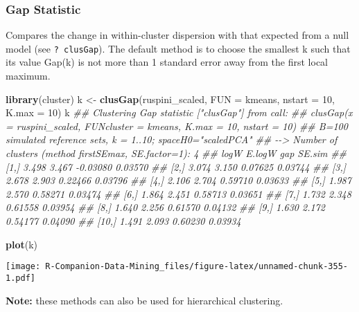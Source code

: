 \documentclass[
  notitlepage]{book}
\newenvironment{Shaded}{\begin{snugshade}}{\end{snugshade}}
\newcommand{\CommentTok}[1]{\textcolor[rgb]{0.56,0.35,0.01}{\textit{#1}}}
\newcommand{\DataTypeTok}[1]{\textcolor[rgb]{0.13,0.29,0.53}{#1}}
\newcommand{\DecValTok}[1]{\textcolor[rgb]{0.00,0.00,0.81}{#1}}
\newcommand{\KeywordTok}[1]{\textcolor[rgb]{0.13,0.29,0.53}{\textbf{#1}}}
\newcommand{\NormalTok}[1]{#1}
\newcommand{\StringTok}[1]{\textcolor[rgb]{0.31,0.60,0.02}{#1}}
\begin{document}
\hypertarget{gap-statistic}{%
\subsubsection{Gap Statistic}\label{gap-statistic}}

Compares the change in within-cluster dispersion with that expected from
a null model (see \texttt{?\ clusGap}). The default method is to choose the
smallest k such that its value Gap(k) is not more than 1 standard error
away from the first local maximum.

\begin{Shaded}
\begin{Highlighting}[]
\KeywordTok{library}\NormalTok{(cluster)}
\NormalTok{k \textless{}{-}}\StringTok{ }\KeywordTok{clusGap}\NormalTok{(ruspini\_scaled, }
             \DataTypeTok{FUN =}\NormalTok{ kmeans,  }
             \DataTypeTok{nstart =} \DecValTok{10}\NormalTok{, }
             \DataTypeTok{K.max =} \DecValTok{10}\NormalTok{)}
\NormalTok{k}
\CommentTok{\#\# Clustering Gap statistic ["clusGap"] from call:}
\CommentTok{\#\# clusGap(x = ruspini\_scaled, FUNcluster = kmeans, K.max = 10, nstart = 10)}
\CommentTok{\#\# B=100 simulated reference sets, k = 1..10; spaceH0="scaledPCA"}
\CommentTok{\#\#  {-}{-}\textgreater{} Number of clusters (method \textquotesingle{}firstSEmax\textquotesingle{}, SE.factor=1): 4}
\CommentTok{\#\#        logW E.logW      gap  SE.sim}
\CommentTok{\#\#  [1,] 3.498  3.467 {-}0.03080 0.03570}
\CommentTok{\#\#  [2,] 3.074  3.150  0.07625 0.03744}
\CommentTok{\#\#  [3,] 2.678  2.903  0.22466 0.03796}
\CommentTok{\#\#  [4,] 2.106  2.704  0.59710 0.03633}
\CommentTok{\#\#  [5,] 1.987  2.570  0.58271 0.03474}
\CommentTok{\#\#  [6,] 1.864  2.451  0.58713 0.03651}
\CommentTok{\#\#  [7,] 1.732  2.348  0.61558 0.03954}
\CommentTok{\#\#  [8,] 1.640  2.256  0.61570 0.04132}
\CommentTok{\#\#  [9,] 1.630  2.172  0.54177 0.04090}
\CommentTok{\#\# [10,] 1.491  2.093  0.60230 0.03934}
\end{Highlighting}
\end{Shaded}

\begin{Shaded}
\begin{Highlighting}[]
\KeywordTok{plot}\NormalTok{(k)}
\end{Highlighting}
\end{Shaded}

\texttt{[image: R-Companion-Data-Mining\_files/figure-latex/unnamed-chunk-355-1.pdf]}

\textbf{Note:} these methods can also be used for hierarchical clustering.
\end{document}
